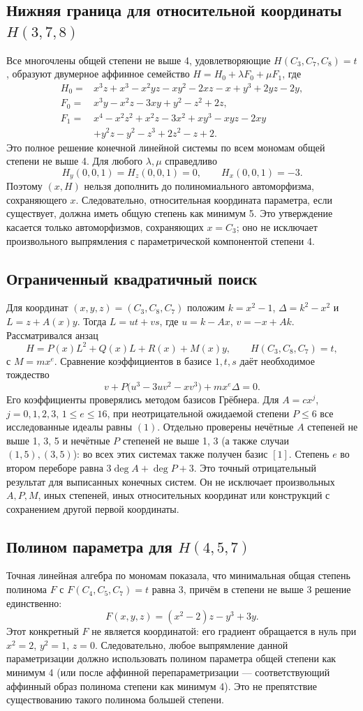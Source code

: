 \subsection{Нижняя граница для относительной координаты $H(3,7,8)$}
Все многочлены общей степени не выше 4, удовлетворяющие
$H(C_3,C_7,C_8)=t$, образуют двумерное аффинное семейство
$H=H_0+\lambda F_0+\mu F_1$, где
\begin{align*}
H_0={}&x^3z+x^3-x^2yz-xy^2-2xz-x+y^3+2yz-2y,\\
F_0={}&x^3y-x^2z-3xy+y^2-z^2+2z,\\
F_1={}&x^4-x^2z^2+x^2z-3x^2+xy^3-xyz-2xy\\
 &+y^2z-y^2-z^3+2z^2-z+2.
\end{align*}
Это полное решение конечной линейной системы по всем мономам общей
степени не выше 4. Для любого $\lambda,\mu$ справедливо
\[
 H_y(0,0,1)=H_z(0,0,1)=0,\qquad H_x(0,0,1)=-3.
\]
Поэтому $(x,H)$ нельзя дополнить до полиномиального автоморфизма,
сохраняющего $x$. Следовательно, относительная координата параметра,
если существует, должна иметь общую степень как минимум 5.
Это утверждение касается только автоморфизмов, сохраняющих $x=C_3$;
оно не исключает произвольного выпрямления с параметрической
компонентой степени 4.

\subsection{Ограниченный квадратичный поиск}
Для координат $(x,y,z)=(C_3,C_8,C_7)$ положим
$k=x^2-1$, $\Delta=k^2-x^2$ и $L=z+A(x)y$.
Тогда $L=ut+vs$, где $u=k-Ax$, $v=-x+Ak$.
Рассматривался анзац
\[
 H=P(x)L^2+Q(x)L+R(x)+M(x)y,
 \qquad H(C_3,C_8,C_7)=t,
\]
с $M=mx^e$. Сравнение коэффициентов в базисе $1,t,s$ даёт
необходимое тождество
\[
 v+P\bigl(u^3-3uv^2-xv^3\bigr)+mx^e\Delta=0.
\]
Его коэффициенты проверялись методом базисов Грёбнера. Для
$A=cx^j$, $j=0,1,2,3$, $1\leq e\leq16$, при неотрицательной
ожидаемой степени $P\leq6$ все исследованные идеалы равны $(1)$.
Отдельно проверены нечётные $A$ степеней не выше 1, 3, 5 и нечётные
$P$ степеней не выше 1, 3 (а также случаи $(1,5),(3,5)$):
во всех этих системах также получен базис $[1]$.
Степень $e$ во втором переборе равна $3\deg A+\deg P+3$.
Это точный отрицательный результат для выписанных конечных систем.
Он не исключает произвольных $A,P,M$, иных степеней, иных относительных
координат или конструкций с сохранением другой первой координаты.

\subsection{Полином параметра для $H(4,5,7)$}
Точная линейная алгебра по мономам показала, что минимальная общая
степень полинома $F$ с $F(C_4,C_5,C_7)=t$ равна 3, причём в степени
не выше 3 решение единственно:
\[
 F(x,y,z)=(x^2-2)z-y^3+3y.
\]
Этот конкретный $F$ не является координатой: его градиент обращается
в нуль при $x^2=2$, $y^2=1$, $z=0$. Следовательно, любое выпрямление
данной параметризации должно использовать полином параметра общей
степени как минимум 4 (или после аффинной перепараметризации ---
соответствующий аффинный образ полинома степени как минимум 4).
Это не препятствие существованию такого полинома большей степени.
